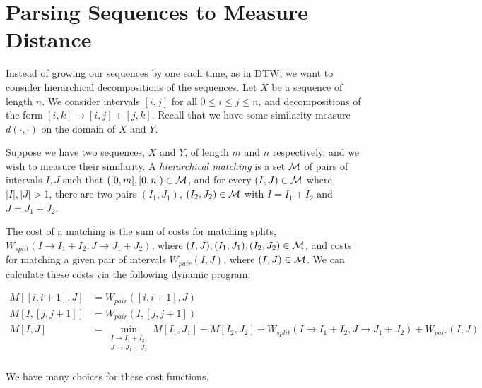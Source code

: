 \section{Parsing Sequences to Measure Distance}

Instead of growing our sequences by one each time, as in DTW, we want
to consider hierarchical decompositions of the sequences. Let $X$ be a
sequence of length $n$. We consider intervals $[i,j]$ for all $0\le i
\le j \le n$, and decompositions of the form $[i,k] \to [i,j] +
    [j,k]$.  Recall that we have some similarity measure
    $d(\cdot,\cdot)$ on the domain of $X$ and $Y$.

Suppose we have two sequences, $X$ and $Y$, of length $m$ and $n$
respectively, and we wish to measure their similarity. A {\em
  hierarchical matching} is a set ${\mathcal M}$ of pairs of intervals $I,J$
such that $([0,m], [0,n])\in {\mathcal M}$, and for every $(I,J) \in {\mathcal M}$
where $|I|, |J|> 1$, there are two pairs $(I_1, J_1)$, $(I_2, J_2)\in
{\mathcal M}$ with $I=I_1 + I_2$ and $J=J_1 + J_2$.

The cost of a matching is the sum of costs for matching splits,
$W_{split}(I\to I_1 + I_2, J\to J_1 + J_2)$, where $(I,J), (I_1,J_1),
(I_2,J_2)\in {\mathcal M}$, and costs for matching a given pair of intervals
$W_{pair}(I,J)$, where $(I,J)\in {\mathcal M}$.
We can calculate these costs via the following dynamic program:

\begin{align*}
M[[i,i+1],J] &= W_{pair}([i, i+1],J)\\
M[I,[j, j+1]] &= W_{pair}(I,[j,j+1])\\
M[I,J] &= \min_{\substack{I\to I_1 + I_2 \\ J\to J_1 + J_2}} 
M[I_1, J_1] + M[I_2, J_2] + W_{split}(I\to I_1 + I_2, J\to J_1 + J_2) + W_{pair}(I,J)\\
\end{align*}

We have many choices for these cost functions.

